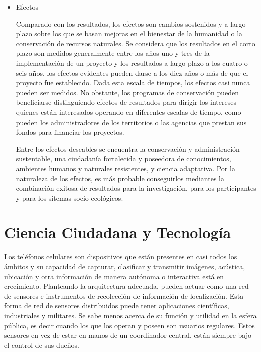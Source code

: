 \begin{itemize}
	\item {Efectos}
	
	Comparado con los resultados, los efectos son cambios sostenidos y a largo plazo sobre los que se basan mejoras en el bienestar de la humanidad o la conservación de recursos naturales. Se considera que los resultados en el corto plazo son medidos generalmente entre los años uno y tres de la implementación de un proyecto y los resultados a largo plazo a los cuatro o seis años, los efectos evidentes pueden darse a los diez años o más de que el proyecto fue establecido. Dada esta escala de tiempos, los efectos casi nunca pueden ser medidos. No obstante, los programas de conservación pueden beneficiarse distinguiendo efectos de resultados para dirigir los intereses quienes están interesados operando en diferentes escalas de tiempo, como pueden los administradores de los territorios o las agencias que prestan sus fondos para financiar los proyectos.
	
	Entre los efectos deseables se encuentra la conservación y administración sustentable, una ciudadanía fortalecida y poseedora de conocimientos, ambientes humanos y naturales resistentes, y ciencia adaptativa. Por la naturaleza de los efectos, es más probable conseguirlos mediantes la combinación exitosa de resultados para la investigación, para los participantes y para los sitemas socio-ecológicos.
		
\end{itemize}	


\section{Ciencia Ciudadana y Tecnología}

	Los teléfonos celulares son dispositivos que están presentes en casi todos los ámbitos y su capacidad de capturar, clasificar y transmitir imágenes, acústica, ubicación y otra información de manera autónoma o interactiva está en crecimiento.
Planteando la arquitectura adecuada, pueden actuar como una red de sensores e instrumentos de recolección de información de localización. 
Esta forma de red de sensores distribuidos puede tener aplicaciones científicas, industriales y militares. Se sabe menos acerca de su función y utilidad en la esfera pública, es decir cuando los que los operan y poseen son usuarios regulares.   Estos sensores en vez de estar en manos de un coordinador central, están siempre bajo el control de sus dueños.


